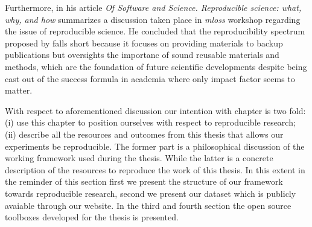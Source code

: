 Furthermore, \citeauthor{varoquaux2015Software} in his article %
\emph{Of Software and Science. Reproducible science: what, why, and how} summarizes a discussion taken place in \emph{\acs{mloss}} workshop regarding the issue of reproducible science.
He concluded that the reproducibility spectrum proposed by \citeauthor{peng2011reproducible} falls short because it focuses on providing materials to backup publications but oversights the importanc of sound reusable materials and methods, which are the foundation of future scientific developments despite being cast out of the success formula in academia where only impact factor seems to matter.

With respect to aforementioned discussion our intention with  chapter is two fold: (i) use this chapter to position ourselves with respect to reproducible research; (ii) describe all the resources and outcomes from this thesis that allows our experiments be reproducible.
The former part is a philosophical discussion of the working framework used during the thesis. 
While the latter is a concrete description of the resources to reproduce the work of this thesis.
In this extent in the reminder of this section first we present the structure of our framework towards reproducible research, second we present our dataset which is publicly avaiable through our website.
In the third and fourth section the open source toolboxes developed for the thesis is presented.

